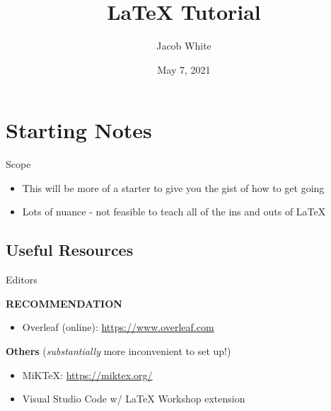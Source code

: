 \documentclass{beamer}
\title{LaTeX Tutorial}
\author{Jacob White}
\institute{Memorial University of Newfoundland}
\date{May 7, 2021}
\begin{document}
\begin{frame}
    \titlepage
\end{frame}


\section{Starting Notes}

\begin{frame}{Scope}

    \begin{itemize}
        \item This will be more of a starter to give you the gist of how to get going
        \item Lots of nuance - not feasible to teach all of the ins and outs of \LaTeX
    \end{itemize}
    
\end{frame}

\subsection{Useful Resources}
\begin{frame}{Editors}

    \textbf{RECOMMENDATION}\\
    \begin{itemize}
        \item Overleaf (online): \url{https://www.overleaf.com}
    \end{itemize}
    \vspace{\baselineskip}
    
    \textbf{Others} (\textit{substantially} more inconvenient to set up!)\\
    \begin{itemize}
        \item MiKTeX: \url{https://miktex.org/}
        \item Visual Studio Code w/ LaTeX Workshop extension
    \end{itemize}
    
\end{frame}
\end{document}
